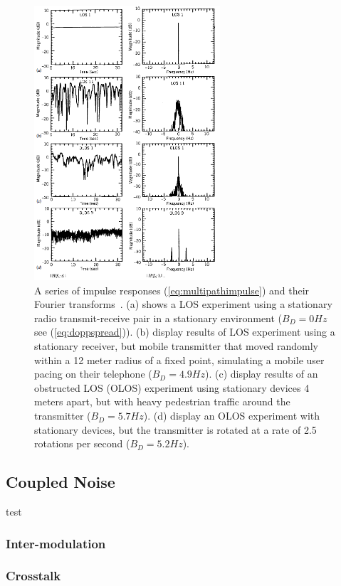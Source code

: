 \FloatBarrier
\begin{figure}[ht!]
	\centering	\includegraphics[width=0.615\textwidth,keepaspectratio]{figs/dopplers.png}
    \caption{A series of impulse responses (\ref{eq:multipathimpulse}) and their Fourier transforms~\cite{pahlavan2005wireless}. (a) shows a LOS experiment using a stationary radio transmit-receive pair in a stationary environment ($B_D=0 Hz$ see (\ref{eq:doppspread})). (b) display results of LOS experiment using a stationary receiver, but mobile transmitter that moved randomly within a 12 meter radius of a fixed point, simulating a mobile user pacing on their telephone ($B_D=4.9 Hz$). (c) display results of an obstructed LOS (OLOS) experiment using stationary devices 4 meters apart, but with heavy pedestrian traffic around the transmitter ($B_D=5.7 Hz$). (d) display an OLOS experiment with stationary devices, but the transmitter is rotated at a rate of 2.5 rotations per second ($B_D=5.2 Hz$).}
\label{fig:dopplers} 
\end{figure}
\FloatBarrier

\subsection{Coupled Noise}
test
\subsubsection{Inter-modulation}
\subsubsection{Crosstalk}
